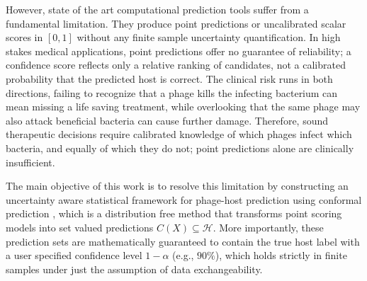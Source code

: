 However, state of the art computational prediction tools suffer from a fundamental limitation. They produce point 
predictions or uncalibrated scalar scores in $[0,1]$ without any finite sample uncertainty quantification. In high stakes 
medical applications, point predictions offer no guarantee of reliability; a confidence score reflects only a relative ranking of 
candidates, not a calibrated probability that the predicted host is correct. The clinical risk runs in both directions, failing to 
recognize that a phage kills the infecting bacterium can mean missing a life saving treatment, while overlooking that the same 
phage may also attack beneficial bacteria can cause further damage. Therefore, sound therapeutic decisions require calibrated 
knowledge of which phages infect which bacteria, and equally of which they do not; point predictions alone are clinically 
insufficient.


The main objective of this work is to resolve this limitation by constructing an uncertainty aware statistical framework 
for phage-host prediction using conformal prediction \cite{vovk2005algorithmic, angelopoulos2023conformal}, which is a 
distribution free method that transforms point scoring models into set valued predictions $C(X) \subseteq \mathcal{H}$. 
More importantly, these prediction sets are mathematically guaranteed to contain the true host label with a user specified 
confidence level $1-\alpha$ (e.g., $90\%$), which holds strictly in finite samples under just the assumption of data exchangeability.



